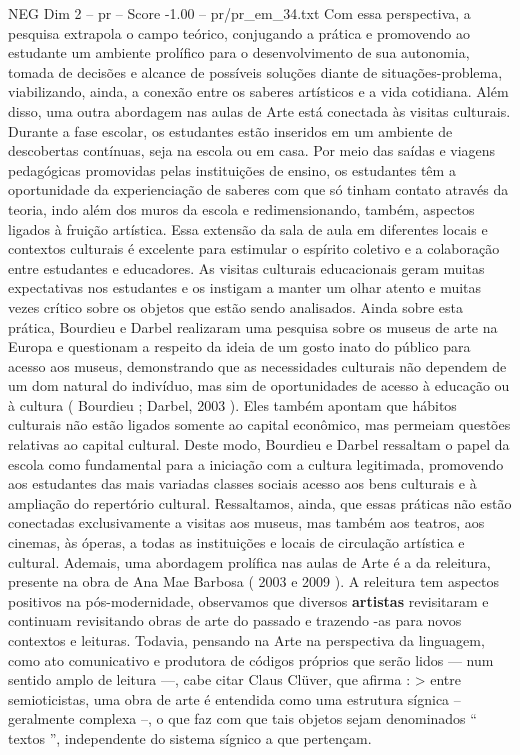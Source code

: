 \begin{textsample}{NEG Dim 2 – pr – Score -1.00 – pr/pr\_em\_34.txt}
Com essa perspectiva, a pesquisa extrapola o campo teórico, conjugando a prática e promovendo ao estudante um ambiente prolífico para o desenvolvimento de sua autonomia, tomada de decisões e alcance de possíveis soluções diante de situações-problema, viabilizando, ainda, a conexão entre os saberes artísticos e a vida cotidiana.
Além disso, uma outra abordagem nas aulas de Arte está conectada às visitas culturais.
Durante a fase escolar, os estudantes estão inseridos em um ambiente de descobertas contínuas, seja na escola ou em casa.
Por meio das saídas e viagens pedagógicas promovidas pelas instituições de ensino, os estudantes têm a oportunidade da experienciação de saberes com que só tinham contato através da teoria, indo além dos muros da escola e redimensionando, também, aspectos ligados à fruição artística.
Essa extensão da sala de aula em diferentes locais e contextos culturais é excelente para estimular o espírito coletivo e a colaboração entre estudantes e educadores.
As visitas culturais educacionais geram muitas expectativas nos estudantes e os instigam a manter um olhar atento e muitas vezes crítico sobre os objetos que estão sendo analisados.
Ainda sobre esta prática, Bourdieu e Darbel realizaram uma pesquisa sobre os museus de arte na Europa e questionam a respeito da ideia de um gosto inato do público para acesso aos museus, demonstrando que as necessidades culturais não dependem de um dom natural do indivíduo, mas sim de oportunidades de acesso à educação ou à cultura ( Bourdieu ; Darbel, 2003 ).
Eles também apontam que hábitos culturais não estão ligados somente ao capital econômico, mas permeiam questões relativas ao capital cultural.
Deste modo, Bourdieu e Darbel ressaltam o papel da escola como fundamental para a iniciação com a cultura legitimada, promovendo aos estudantes das mais variadas classes sociais acesso aos bens culturais e à ampliação do repertório cultural.
Ressaltamos, ainda, que essas práticas não estão conectadas exclusivamente a visitas aos museus, mas também aos teatros, aos cinemas, às óperas, a todas as instituições e locais de circulação artística e cultural.
Ademais, uma abordagem prolífica nas aulas de Arte é a da releitura, presente na obra de Ana Mae Barbosa ( 2003 e 2009 ).
A releitura tem aspectos positivos na pós-modernidade, observamos que diversos \textbf{artistas} revisitaram e continuam revisitando obras de arte do passado e trazendo -as para novos contextos e leituras.
Todavia, pensando na Arte na perspectiva da linguagem, como ato comunicativo e produtora de códigos próprios que serão lidos — num sentido amplo de leitura —, cabe citar Claus Clüver, que afirma : > entre semioticistas, uma obra de arte é entendida como uma estrutura sígnica – geralmente complexa –, o que faz com que tais objetos sejam denominados “ textos ”, independente do sistema sígnico a que pertençam.

\end{textsample}
